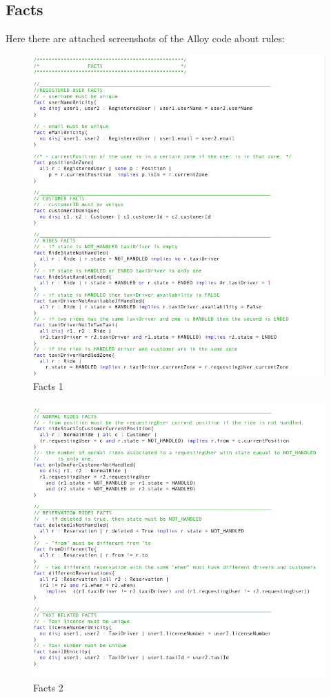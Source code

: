 		\subsection{Facts}
		Here there are attached screenshots of the Alloy code about rules:

				\begin{figure}[H]
					\centering
					\includegraphics[width=\textwidth, scale=0.5]{IMG/ALLOY/FACT_1.png}
					\caption{Facts 1}\label{sec:FigureFacts1}
				\end{figure}

				\begin{figure}[H]
					\centering
					\includegraphics[width=\textwidth, scale=0.5]{IMG/ALLOY/FACT_2.png}
					\caption{Facts 2}\label{sec:FigureFacts2}
				\end{figure}

